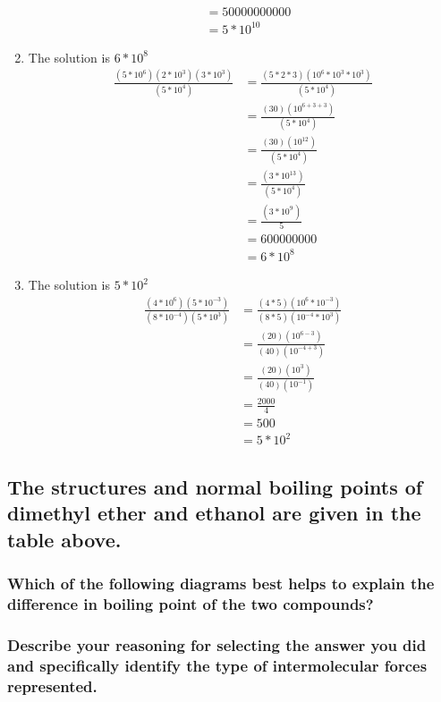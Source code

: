 \documentclass[11pt]{article}
\begin{document}
\begin{enumerate}
\begin{align*}
&=50000000000\\
&=5*10^{10}
\end{align*}
\item The solution is \(6*10^8\)
\begin{align*}
\frac{(5*10^6)(2*10^3)(3*10^3)}{(5*10^4)}&=\frac{(5*2*3)(10^6*10^3*10^3)}{(5*10^4)}\\
&=\frac{(30)(10^{6+3+3})}{(5*10^4)}\\
&=\frac{(30)(10^{12}^{})}{(5*10^4)}\\
&=\frac{(3*10^{13}^{}^{})}{(5*10^4)}\\
&=\frac{(3*10^9^{}^{}^{})}{5}\\
&=600000000\\
&=6*10^8
\end{align*}
\item The solution is \(5*10^2^{}\)
\begin{align*}
\frac{(4*10^6)(5*10^{-3})}{(8*10^{-4})(5*10^3)}&=\frac{(4*5)(10^6*10^{-3})}{(8*5)(10^{-4}*10^3)}\\
&=\frac{(20)(10^{6-3}^{})}{(40)(10^{-4+3})}\\
&=\frac{(20)(10^3^{})}{(40)(10^{-1})}^{}\\
&=\frac{2000}{4}\\
&=500\\
&=5*10^2
\end{align*}
\end{enumerate}

\subsection{The structures and normal boiling points of dimethyl ether and ethanol are given in the table above.}
\label{sec:orgbb1fbff}
\subsubsection{Which of the following diagrams best helps to explain the difference in boiling point of the two compounds?}
\label{sec:orgc0ac46a}


\subsubsection{Describe your reasoning for selecting the answer you did and specifically identify the type of intermolecular forces represented.}
\label{sec:orge10d78a}
\end{document}
